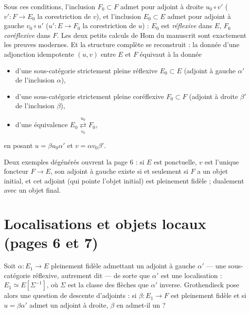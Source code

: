 \documentclass[11pt,a4paper]{article}
\begin{document}
Sous ces conditions, l'inclusion $F_0 \subset F$ admet pour adjoint à
droite $u_0 \circ v'$ ($v' : F \to E_0$ la corestriction de $v$), et
l'inclusion $E_0 \subset E$ admet pour adjoint à gauche $v_0 \circ u'$
($u' : E \to F_0$ la corestriction de $u$) : $E_0$ est
\emph{réflexive} dans $E$, $F_0$ \emph{coréflexive} dans $F$. Les deux
petits calculs de Hom du manuscrit sont exactement les preuves modernes.
Et la structure complète se reconstruit : la donnée d'une adjonction
idempotente $(u, v)$ entre $E$ et $F$ équivaut à la donnée
\begin{itemize}
\item d'une sous-catégorie strictement pleine réflexive $E_0 \subset E$
(adjoint à gauche $\alpha'$ de l'inclusion $\alpha$),
\item d'une sous-catégorie strictement pleine coréflexive $F_0 \subset F$
(adjoint à droite $\beta'$ de l'inclusion $\beta$),
\item d'une équivalence $E_0 \underset{v_0}{\overset{u_0}{\rightleftarrows}} F_0$,
\end{itemize}
en posant $u = \beta u_0 \alpha'$ et $v = \alpha v_0 \beta'$.

Deux exemples dégénérés ouvrent la page 6 : si $E$ est ponctuelle, $v$
est l'unique foncteur $F \to E$, son adjoint à gauche existe si et
seulement si $F$ a un objet initial, et cet adjoint (qui pointe l'objet
initial) est pleinement fidèle ; dualement avec un objet final.

\section*{Localisations et objets locaux (pages 6 et 7)}

Soit $\alpha : E_1 \to E$ pleinement fidèle admettant un adjoint à gauche
$\alpha'$ — une sous-catégorie réflexive, autrement dit — de sorte que
$\alpha'$ est une localisation : $E_1 \simeq E[\Sigma^{-1}]$, où $\Sigma$
est la classe des flèches que $\alpha'$ inverse. Grothendieck pose alors
une question de descente d'adjoints : si $\beta : E_1 \to F$ est pleinement
fidèle et si $u = \beta\alpha'$ admet un adjoint à droite, $\beta$
en admet-il un ?
\end{document}
